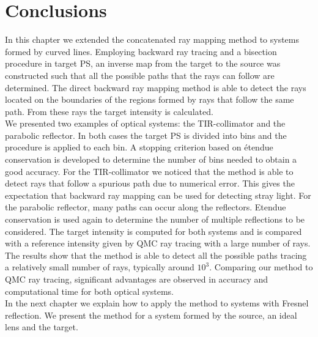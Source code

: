 \section{Conclusions}
In this chapter we extended the concatenated ray mapping method to systems formed by curved lines. Employing backward ray tracing and a bisection procedure in target PS, an inverse map from the target to the source was constructed such that all the possible paths that the rays can follow are determined. The direct backward ray mapping method is able to detect the rays located on the boundaries of the regions formed by rays that follow the same path. From these rays the target intensity is calculated. 
\\ \indent
We presented two examples of optical systems: the TIR-collimator and the parabolic reflector. In both cases the target PS is divided into bins and the procedure is applied to each bin. A stopping criterion based on \'{e}tendue conservation is developed to determine the number of bins needed to obtain a good accuracy. For the TIR-collimator we noticed that the method is able to detect rays that follow a spurious path due to numerical error. This gives the expectation that backward ray mapping can be used for detecting stray light.
For the parabolic reflector, many paths can occur along the reflectors. Etendue conservation is used again to determine the number of multiple reflections to be considered. The target intensity is computed for both systems and is compared with a reference intensity given by QMC ray tracing with a large number of rays. The results show that the method is able to detect all the possible paths tracing a relatively small number of rays, typically around $10^3$. Comparing our method to QMC ray tracing, significant advantages are observed in accuracy and computational time for both optical systems.
\\ \indent In the next chapter we explain how to apply the method to systems with Fresnel reflection. We present the method for a system formed by the source, an ideal lens and the target. 














